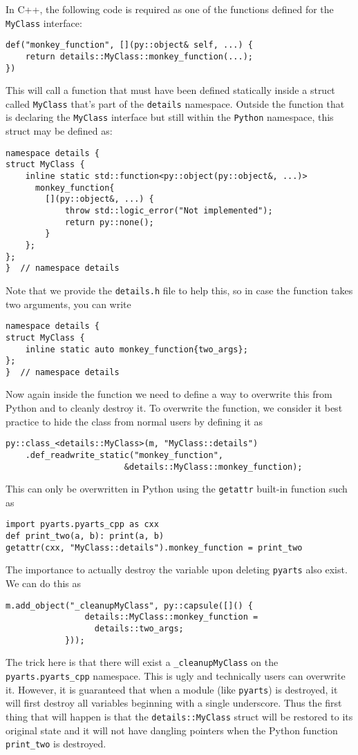 In C++, the following code is required as one of the functions defined for the \verb|MyClass| interface:
\begin{verbatim}
def("monkey_function", [](py::object& self, ...) {
    return details::MyClass::monkey_function(...);
})
\end{verbatim}
This will call a function that must have been defined statically inside a struct called \verb|MyClass| that's part of the \verb|details| namespace.
Outside the function that is declaring the \verb|MyClass| interface but still within the \verb|Python| namespace, this struct may be defined as:
\begin{verbatim}
namespace details {
struct MyClass {
    inline static std::function<py::object(py::object&, ...)>
      monkey_function{
        [](py::object&, ...) {
            throw std::logic_error("Not implemented");
            return py::none();
        }
    };
};
}  // namespace details
\end{verbatim}
Note that we provide the \verb|details.h| file to help this, so in case the function takes two arguments, you can write
\begin{verbatim}
namespace details {
struct MyClass {
    inline static auto monkey_function{two_args};
};
}  // namespace details
\end{verbatim}
Now again inside the function we need to define a way to overwrite this from Python and to cleanly destroy it.
To overwrite the function, we consider it best practice to hide the class from normal users by defining it as
\begin{verbatim}
py::class_<details::MyClass>(m, "MyClass::details")
    .def_readwrite_static("monkey_function",
                        &details::MyClass::monkey_function);
\end{verbatim}
This can only be overwritten in Python using the \verb|getattr| built-in function such as
\begin{verbatim}
import pyarts.pyarts_cpp as cxx
def print_two(a, b): print(a, b)
getattr(cxx, "MyClass::details").monkey_function = print_two
\end{verbatim}
The importance to actually destroy the variable upon deleting \verb|pyarts| also exist.  We can do this as
\begin{verbatim}
m.add_object("_cleanupMyClass", py::capsule([]() {
                details::MyClass::monkey_function =
                  details::two_args;
            }));
\end{verbatim}
The trick here is that there will exist a \verb|_cleanupMyClass| on the \verb|pyarts.pyarts_cpp| namespace.
This is ugly and technically users can overwrite it.  However, it is guaranteed that when a module (like \verb|pyarts|)
is destroyed, it will first destroy all variables beginning with a single underscore.  Thus the first thing that will
happen is that the \verb|details::MyClass| struct will be restored to its original state and it will not have dangling
pointers when the Python function \verb|print_two| is destroyed.

